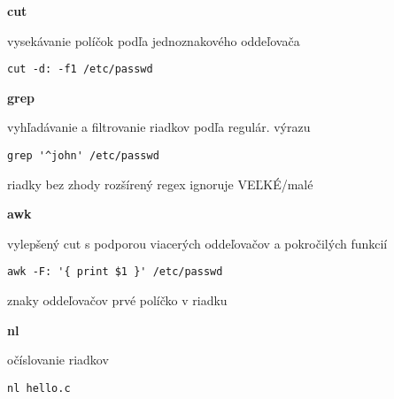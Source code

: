 \documentclass[8pt,landscape]{extarticle}
\newcommand{\Heading}[1]{%
{\begin{center}\bfseries\Large#1\end{center}}%
}%
\newcommand{\Em}[1]{\Ovalbox{#1}}
\newenvironment{karticka}[1]%
{%
\Heading{#1}%
}%
{%
\clearpage
}%
\begin{document}
\begin{karticka}{cut}
\begin{obsah}
vysekávanie políčok podľa jednoznakového oddeľovača
\end{obsah}
\begin{middlecolorbox}
\begin{Verbatim}
cut -d: -f1 /etc/passwd
\end{Verbatim}
\end{middlecolorbox}
\end{karticka}
\begin{karticka}{grep}
\begin{obsah}
vyhľadávanie a filtrovanie riadkov podľa regulár. výrazu
\end{obsah}
\begin{middlecolorbox}
\begin{Verbatim}
grep '^john' /etc/passwd
\end{Verbatim}
\end{middlecolorbox}

\begin{obsah}
\Em{-v} riadky bez zhody     \Em{-E} rozšírený regex
\Em{-i} ignoruje VEĽKÉ/malé  
\end{obsah}
\end{karticka}
\begin{karticka}{awk}
\begin{obsah}
vylepšený cut s podporou viacerých oddeľovačov a 
pokročilých funkcií
\end{obsah}
\begin{middlecolorbox}
\begin{Verbatim}
awk -F: '{ print $1 }' /etc/passwd 
\end{Verbatim}
\end{middlecolorbox}
\begin{obsah}
\Em{-F} znaky oddeľovačov    
\Em{$1} prvé políčko v riadku
\end{obsah}

\end{karticka}
\begin{karticka}{nl}
\begin{obsah}
očíslovanie riadkov
\end{obsah}
\begin{middlecolorbox}
\begin{Verbatim}
nl hello.c
\end{Verbatim}
\end{middlecolorbox}
\end{karticka}
\end{document}
